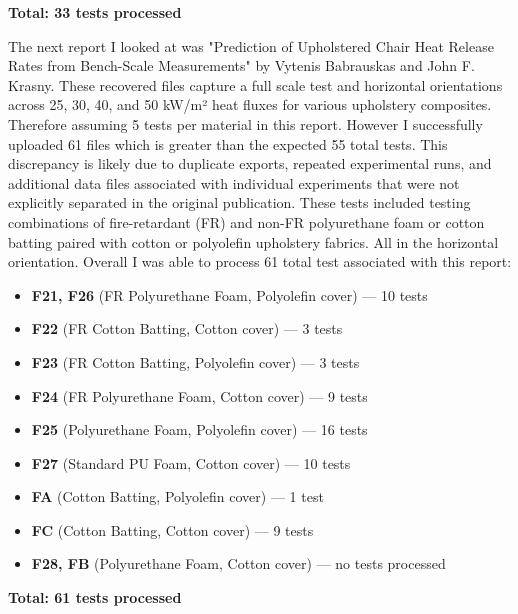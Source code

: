 \documentclass{abstract}
\begin{document}
\noindent\textbf{Total: 33 tests processed}

The next report I looked at was "Prediction of Upholstered Chair Heat Release Rates from Bench-Scale Measurements" by Vytenis Babrauskas and John F. Krasny. These recovered files capture a full scale test and horizontal orientations across 25, 30, 40, and 50 kW/m² heat fluxes for various upholstery composites. Therefore assuming 5 tests per material in this report. However I successfully uploaded 61 files which is greater than the expected 55 total tests. This discrepancy is likely due to duplicate exports, repeated experimental runs, and additional data files associated with individual experiments that were not explicitly separated in the original publication. These tests included testing combinations of fire-retardant (FR) and non-FR polyurethane foam or cotton batting paired with cotton or polyolefin upholstery fabrics. All in the horizontal orientation. Overall I was able to process 61 total test associated with this report:

\begin{itemize}
	\item \textbf{F21, F26} (FR Polyurethane Foam, Polyolefin cover) --- 10 tests
	\item \textbf{F22} (FR Cotton Batting, Cotton cover) --- 3 tests
	\item \textbf{F23} (FR Cotton Batting, Polyolefin cover) --- 3 tests
	\item \textbf{F24} (FR Polyurethane Foam, Cotton cover) --- 9 tests
	\item \textbf{F25} (Polyurethane Foam, Polyolefin cover) --- 16 tests
	\item \textbf{F27} (Standard PU Foam, Cotton cover) --- 10 tests
	\item \textbf{FA} (Cotton Batting, Polyolefin cover) --- 1 test
	\item \textbf{FC} (Cotton Batting, Cotton cover) --- 9 tests
	\item \textbf{F28, FB} (Polyurethane Foam, Cotton cover) --- no tests processed
\end{itemize}

\noindent\textbf{Total: 61 tests processed}

\pagebreak
\end{document}
